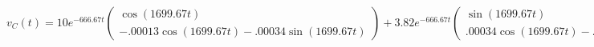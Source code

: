 \documentclass[preview]{standalone}
\begin{document}
\begin{center}
\[
                                v_C(t) = 10e^{-666.67t}
                                \begin{pmatrix} 
                                \cos(1699.67t) \\ 
                                -.00013\cos(1699.67t) - .00034\sin(1699.67t)
                                \end{pmatrix} + 3.82e^{-666.67t}
                                \begin{pmatrix} 
                                \sin(1699.67t) \\ 
                                .00034\cos(1699.67t) - .00013\sin(1699.67t)
                                \end{pmatrix}
                        \]
\end{center}
\end{document}
